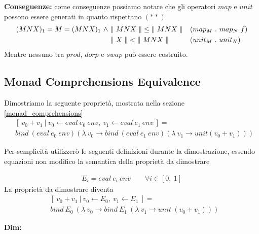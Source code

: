 \textbf{Conseguenze:} come conseguenze possiamo notare che gli operatori $map$ e
$unit$ possono essere generati in quanto rispettano $(**)$
\begin{align*}
  (MNX)_1 = M = (MNX)_1\  \land\  &{\parallel MNX\parallel} \leq {\parallel MNX\parallel} &&(map_M\ .\ map_N\ f)\\
  &{\parallel X\parallel} < {\parallel MNX\parallel} &&(unit_M\ .\ unit_N)
\end{align*}
Mentre nessuno tra $prod$, $dorp$ e $swap$ può essere costruito.

\pagebreak
\subsection{Monad Comprehensions Equivalence}
\label{monad_comprehensions_equivalence}
Dimostriamo la seguente proprietà, mostrata nella sezione \ref{monad_comprehensions}
\begin{align*}
    &{[\ v_0 + v_1\ |\ v_0 \leftarrow eval\ e_0\ env,\ v_1 \leftarrow eval\ e_1\ env\ ]} = \\
    &bind\ (eval\ e_0\ env) (\lambda\ v_0 \to bind\ (eval\ e_1\ env) (\lambda\ v_1 \to unit (v_0 + v_1)))
\end{align*}

Per semplicità utilizzerò le seguenti definizioni durante la dimostrazione,
essendo equazioni non modifico la semantica della proprietà da dimostrare

\begin{align*}
    E_i = eval\  e_i\  env \qquad \forall i \in {[0,\ 1]}
\end{align*}
La proprietà da dimostrare diventa
\begin{align*}
    &{[\ v_0 + v_1\ |\ v_0 \leftarrow E_0,\ v_1 \leftarrow E_1\ ]} = \\
    &bind\ E_0\ (\lambda\ v_0 \to bind\ E_1\ (\lambda\ v_1 \to unit\ (v_0 + v_1)))
\end{align*}

\textbf{Dim:}\newline

